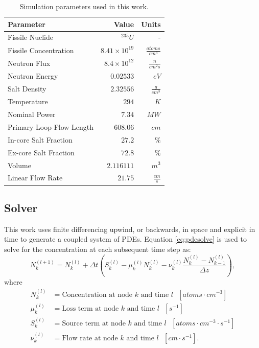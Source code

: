 \documentclass{style/nseJournal}
\begin{document}
\renewcommand{\arraystretch}{1.1}
\begin{table}[!ht]
    \centering
    \caption{Simulation parameters used in this work.}
    \begin{tabular}{l r r}
    \hline
    Parameter & Value & Units\\
    \hline
    Fissile Nuclide  & $^{235}U$ & - \\
    Fissile Concentration & $8.41 \times 10^{19}$  & $\frac{atoms}{cm^3}$\\
    Neutron Flux & $8.4 \times 10^{12}$ & $\frac{n}{cm^2 s}$\\
    Neutron Energy & $0.02533$  & $eV$\\
    Salt Density & $2.32556$ & $\frac{g}{cm^3}$\\
    Temperature & $294$ &  $K$\\
    Nominal Power & $7.34$  & $MW$\\
    Primary Loop Flow Length & $608.06$ & $cm$\\
    In-core Salt Fraction & $27.2$ & $\%$\\
    Ex-core Salt Fraction & $72.8$ & $\%$\\
    Volume & $2.116111$ & $m^3$\\
    Linear Flow Rate & $21.75$ & $\frac{cm}{s}$\\
    \hline
    \end{tabular}
    
    \label{tab:sim-params}
\end{table}
\renewcommand{\arraystretch}{1}

\subsection{Solver}

This work uses finite differencing upwind, or backwards, in space and explicit in time to generate a coupled system of PDEs.
Equation \eqref{eq:pdesolve} is used to solve for the concentration at each subsequent time step as:
\begin{equation}
    N_k^{(l+1)} = N_k^{(l)} 
+ \Delta t \left( 
S_k^{(l)} 
- \mu_k^{(l)} N_k^{(l)} 
- \nu_k^{(l)}  \frac{ N_k^{(l)} - N_{k-1}^{(l)} }{\Delta z}
\right),
    \label{eq:pdesolve}
\end{equation}
where
\begin{align}
    N_{k}^{(l)} &= \text{Concentration at node $k$ and time $l$ $[atoms \cdot cm^{-3}]$} \nonumber \\
    \mu_{k}^{(l)} &= \text{Loss term at node $k$ and time $l$ $[s^{-1}]$} \nonumber \\
    S_{k}^{(l)} &= \text{Source term at node $k$ and time $l$ $[atoms \cdot cm^{-3} \cdot s^{-1}]$} \nonumber \\
    \nu_{k}^{(l)} &= \text{Flow rate at node $k$ and time $l$ $[cm \cdot s^{-1}]$}.
\end{align}
\end{document}
